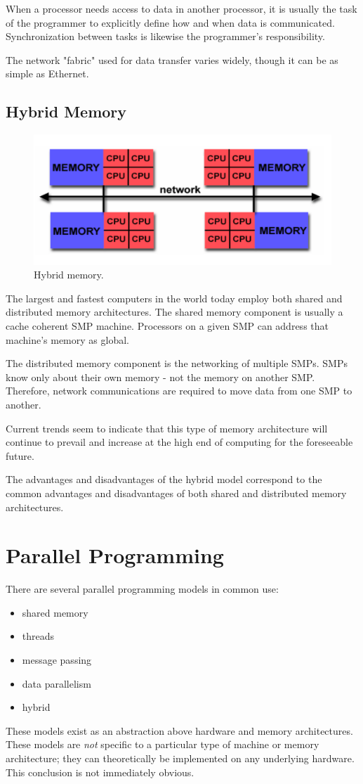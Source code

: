 When a processor needs access to data in another processor, it is usually the task of the programmer to explicitly define how and when data is communicated. Synchronization between tasks is likewise the programmer's responsibility.

The network "fabric" used for data transfer varies widely, though it can be as simple as Ethernet. 

\subsection{Hybrid Memory}
\label{ssec:hybrid}
\begin{figure}
\centering
\includegraphics[width=0.5\linewidth]{screenshot055}
\caption{Hybrid memory.}
\label{fig:screenshot055}
\end{figure}

The  largest and fastest computers in the world today employ both shared and distributed memory architectures. The shared memory component is usually a cache coherent SMP machine. Processors on a given SMP can address that machine's memory as global. 

The distributed memory component is the networking of multiple SMPs. SMPs know only about their own memory - not the memory on another SMP. Therefore, network communications are required to move data from one SMP to another. 

Current trends seem to indicate that this type of memory architecture will continue to prevail and increase at the high end of computing for the foreseeable future. 

The advantages and disadvantages of the hybrid model correspond to the common advantages and disadvantages of both shared and distributed memory architectures.

\section{Parallel Programming}
There are several parallel programming models in common use: \begin{itemize}
\item shared memory
\item threads
\item message passing
\item data parallelism
\item hybrid
\end{itemize}
These models exist as an abstraction above hardware and memory architectures. These models are \textit{not} specific to a particular type of machine or memory architecture; they can theoretically be implemented on any underlying hardware. This conclusion is not immediately obvious.

